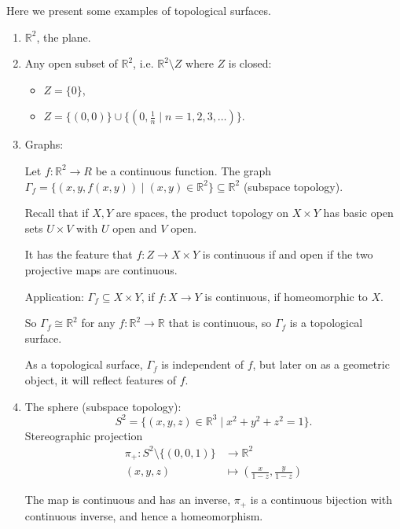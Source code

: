 \begin{example}
    Here we present some examples of topological surfaces.
    \begin{enumerate}
        \item \(\mathbb{R}^2\), the plane.
        \item Any open subset of \(\mathbb{R}^2\), i.e. \(\mathbb{R}^2 \setminus Z\) where \(Z\) is closed:
        \begin{itemize}
            \item \(Z = \{0\}\),
            \item \(Z = \{(0,0)\}\cup \{(0,\frac{1}{n}\mid n = 1,2,3, \ldots )\}\).
        \end{itemize}
        \item Graphs:

        Let \(f: \mathbb{R}^2 \to R\) be a continuous function. The graph \(\Gamma_f = \{(x,y,f(x, y))\mid (x,y) \in \mathbb{R}^2\} \subseteq \mathbb{R}^2\) (subspace topology).

        Recall that if \(X, Y\) are spaces, the product topology on \(X \times Y\) has basic open sets \(U \times V\) with \(U\) open and \(V\) open.

        It has the feature that \(f: Z \to  X \times Y\) is continuous if and open if the two projective maps are continuous.

        Application: \(\Gamma_f \subseteq X \times Y \), if \(f: X \to Y\) is continuous, if homeomorphic to \(X\).

        So \(\Gamma_f \cong \mathbb{R}^2\) for any \(f: \mathbb{R}^2 \to \mathbb{R}\) that is continuous, so \(\Gamma_f\) is a topological surface.

        \begin{note}
            As a topological surface, \(\Gamma_f\) is independent of \(f\), but later on as a geometric object, it will reflect features of \(f\). 
        \end{note}
        \item The sphere (subspace topology):
        \[
            S^2 = \{(x,y,z) \in \mathbb{R}^3 \mid x^2 + y^2 + z^2 = 1\}.
        \]
        Stereographic projection
        \begin{align*}
            \pi_+: S^2 \setminus \{(0,0,1)\} &\to \mathbb{R}^2\\
            (x,y,z) &\mapsto (\frac{x}{1-z}, \frac{y}{1 - z})
        \end{align*}
        \begin{note}
            The map is continuous and has an inverse,
            \(\pi_+\) is a continuous bijection with continuous inverse, and hence a homeomorphism.


\end{note}
\end{enumerate}
\end{example}
